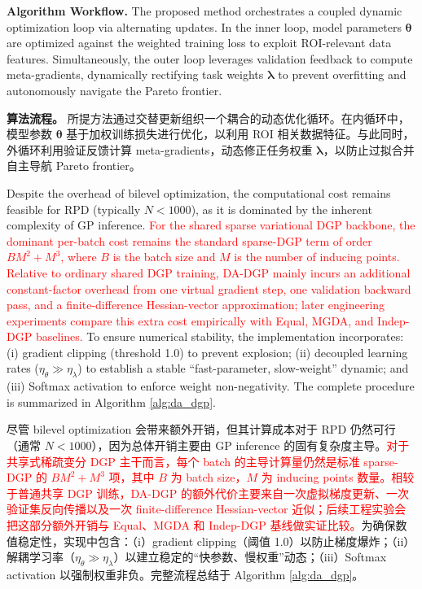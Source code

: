 \documentclass[11pt]{article}
\begin{document}
\textbf{Algorithm Workflow.} The proposed method orchestrates a coupled dynamic optimization loop via alternating updates. In the inner loop, model parameters $\boldsymbol{\theta}$ are optimized against the weighted training loss to exploit ROI-relevant data features. Simultaneously, the outer loop leverages validation feedback to compute meta-gradients, dynamically rectifying task weights $\boldsymbol{\lambda}$ to prevent overfitting and autonomously navigate the Pareto frontier.

\textbf{算法流程。} 所提方法通过交替更新组织一个耦合的动态优化循环。在内循环中，模型参数 $\boldsymbol{\theta}$ 基于加权训练损失进行优化，以利用 ROI 相关数据特征。与此同时，外循环利用验证反馈计算 meta-gradients，动态修正任务权重 $\boldsymbol{\lambda}$，以防止过拟合并自主导航 Pareto frontier。

Despite the overhead of bilevel optimization, the computational cost remains feasible for RPD (typically $N<1000$), as it is dominated by the inherent complexity of GP inference. \textcolor{red}{For the shared sparse variational DGP backbone, the dominant per-batch cost remains the standard sparse-DGP term of order $B M^2 + M^3$, where $B$ is the batch size and $M$ is the number of inducing points. Relative to ordinary shared DGP training, DA-DGP mainly incurs an additional constant-factor overhead from one virtual gradient step, one validation backward pass, and a finite-difference Hessian-vector approximation; later engineering experiments compare this extra cost empirically with Equal, MGDA, and Indep-DGP baselines.} To ensure numerical stability, the implementation incorporates: (i) gradient clipping (threshold 1.0) to prevent explosion; (ii) decoupled learning rates ($\eta_{\theta} \gg \eta_{\lambda}$) to establish a stable ``fast-parameter, slow-weight'' dynamic; and (iii) Softmax activation to enforce weight non-negativity. The complete procedure is summarized in Algorithm \ref{alg:da_dgp}.

尽管 bilevel optimization 会带来额外开销，但其计算成本对于 RPD 仍然可行（通常 $N<1000$），因为总体开销主要由 GP inference 的固有复杂度主导。\textcolor{red}{对于共享式稀疏变分 DGP 主干而言，每个 batch 的主导计算量仍然是标准 sparse-DGP 的 $B M^2 + M^3$ 项，其中 $B$ 为 batch size，$M$ 为 inducing points 数量。相较于普通共享 DGP 训练，DA-DGP 的额外代价主要来自一次虚拟梯度更新、一次验证集反向传播以及一次 finite-difference Hessian-vector 近似；后续工程实验会把这部分额外开销与 Equal、MGDA 和 Indep-DGP 基线做实证比较。}为确保数值稳定性，实现中包含：（i）gradient clipping（阈值 1.0）以防止梯度爆炸；（ii）解耦学习率（$\eta_{\theta} \gg \eta_{\lambda}$）以建立稳定的“快参数、慢权重”动态；（iii）Softmax activation 以强制权重非负。完整流程总结于 Algorithm \ref{alg:da_dgp}。
\end{document}
